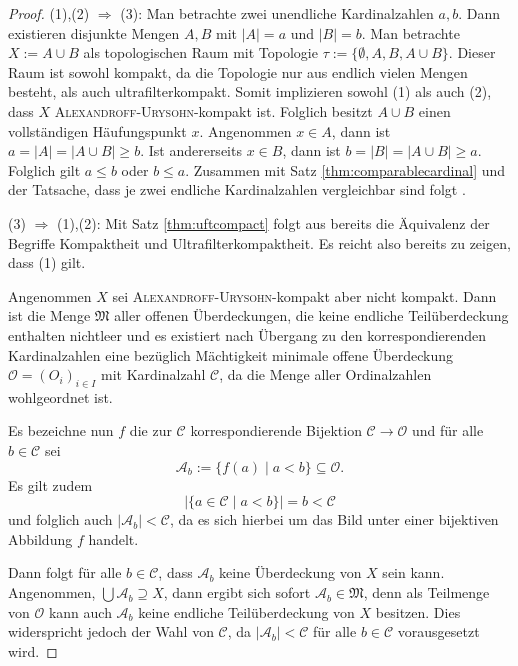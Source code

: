 \begin{proof}
  (1),(2) $\Rightarrow$ (3):
  Man betrachte zwei unendliche Kardinalzahlen $a,b$.
  Dann existieren disjunkte Mengen $A,B$ mit $|A| = a$ und $|B| = b$.
  Man betrachte $X := A \cup B$ als topologischen Raum mit Topologie $\tau := \{\emptyset, A, B, A \cup B\}$.
  Dieser Raum ist sowohl kompakt, da die Topologie nur aus endlich vielen Mengen besteht, als auch ultrafilterkompakt. 
  Somit implizieren sowohl (1) als auch (2), dass $X$ \textsc{Alexandroff}\hyp{}\textsc{Urysohn}\hyp{}kompakt ist.
  Folglich besitzt $A \cup B$ einen vollständigen Häufungspunkt $x$.
  Angenommen $x \in A$, dann ist $a = |A| = |A \cup B| \geq b$. 
  Ist andererseits $x \in B$, dann ist $b = |B| = |A \cup B| \geq a$.
  Folglich gilt $a \leq b$ oder $b \leq a$.
  Zusammen mit Satz \ref{thm:comparablecardinal} und der Tatsache, dass je zwei endliche Kardinalzahlen vergleichbar sind folgt \AC.

  (3) $\Rightarrow$ (1),(2):
  Mit Satz \ref{thm:uftcompact} folgt aus \UFT bereits die Äquivalenz der Begriffe Kompaktheit und Ultrafilterkompaktheit.
  Es reicht also bereits zu zeigen, dass (1) gilt.

  Angenommen $X$ sei \textsc{Alexandroff}\hyp{}\textsc{Urysohn}\hyp{}kompakt aber nicht kompakt.
  Dann ist die Menge $\mathfrak{M}$ aller offenen Überdeckungen, die keine endliche Teilüberdeckung enthalten nichtleer und es existiert nach Übergang zu den korrespondierenden Kardinalzahlen eine bezüglich Mächtigkeit minimale offene Überdeckung $\mathcal{O} = (O_i)_{i \in I}$ mit Kardinalzahl $\mathcal{C}$, da die Menge aller Ordinalzahlen wohlgeordnet ist.

  Es bezeichne nun $f$ die zur $\mathcal{C}$ korrespondierende Bijektion $\mathcal{C} \to \mathcal{O}$ und für alle $b \in \mathcal{C}$ sei 
  \begin{displaymath}
    \mathcal{A}_b := \{ f(a) \mid a < b\} \subseteq \mathcal{O}.
  \end{displaymath}
  Es gilt zudem
  \begin{displaymath}
    | \{ a \in \mathcal{C} \mid a < b \} | = b < \mathcal{C}
  \end{displaymath}
  und folglich auch $| \mathcal{A}_b | < \mathcal{C}$, da es sich hierbei um das Bild unter einer bijektiven Abbildung $f$ handelt.

  Dann folgt für alle $b \in \mathcal{C}$, dass $\mathcal{A}_b$ keine Überdeckung von $X$ sein kann.
  Angenommen, $\bigcup \mathcal{A}_b \supseteq X$, dann ergibt sich sofort $\mathcal{A}_b \in \mathfrak{M}$, denn als Teilmenge von $\mathcal{O}$ kann auch $\mathcal{A}_b$ keine endliche Teilüberdeckung von $X$ besitzen.
  Dies widerspricht jedoch der Wahl von $\mathcal{C}$, da $|\mathcal{A}_b| < \mathcal{C}$ für alle $b \in \mathcal{C}$ vorausgesetzt wird.


\end{proof}
